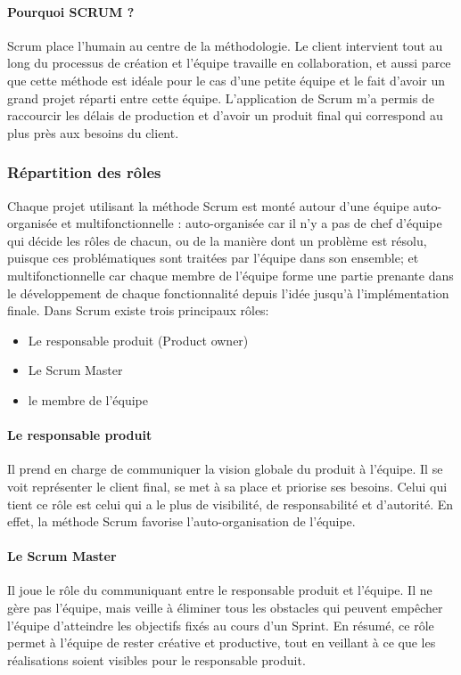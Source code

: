 
\paragraph{Pourquoi SCRUM ?}
Scrum place l’humain au centre de la méthodologie. Le client intervient tout au long
du processus de création et l’équipe travaille en collaboration, et aussi parce que cette
méthode est idéale pour le cas d’une petite équipe et le fait d’avoir un grand projet réparti
entre cette équipe.
L’application de Scrum m’a permis de raccourcir les délais de production et d’avoir
un produit final qui correspond au plus près aux besoins du client.

\subsubsection{Répartition des rôles}
Chaque projet utilisant la méthode Scrum est monté autour d’une équipe auto-
organisée et multifonctionnelle : auto-organisée car il n’y a pas de chef d’équipe qui
décide les rôles de chacun, ou de la manière dont un problème est résolu, puisque ces
problématiques sont traitées par l’équipe dans son ensemble; et multifonctionnelle car
chaque membre de l’équipe forme une partie prenante dans le développement de
chaque fonctionnalité depuis l’idée jusqu’à l’implémentation finale.
Dans Scrum existe trois principaux rôles:
\begin{itemize}
 \item Le responsable produit (Product owner)
 \item Le Scrum Master
 \item le membre de l’équipe
\end{itemize}
\paragraph{Le responsable produit}
Il prend en charge de communiquer la
vision globale du produit à l’équipe. 
Il se voit représenter le client final, se met à sa place
et priorise ses besoins. Celui qui tient ce rôle est celui qui 
a le plus de visibilité, de responsabilité et d’autorité.
En effet, la méthode Scrum favorise l’auto-organisation de l'équipe.
\paragraph{Le Scrum Master}
Il joue le rôle du communiquant entre le responsable produit et
l’équipe. Il ne gère pas l’équipe, mais veille à éliminer tous les obstacles qui peuvent
empêcher l’équipe d’atteindre les objectifs fixés au cours d’un Sprint. En résumé, ce rôle
permet à l’équipe de rester créative et productive, tout en veillant à ce que les
réalisations soient visibles pour le responsable produit.
